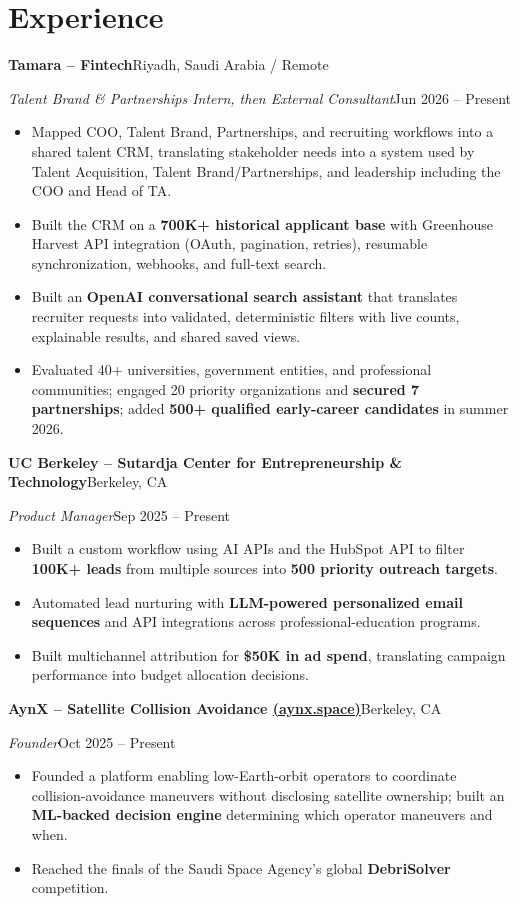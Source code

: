 \documentclass[a4paper,10pt]{article}
\newcommand{\entry}[4]{%
  \textbf{#1}\hfill #2\par
  \textit{#3}\hfill #4\par
}
\begin{document}
\section{Experience}
\entry{Tamara -- Fintech}{Riyadh, Saudi Arabia / Remote}
{Talent Brand \& Partnerships Intern, then External Consultant}{Jun 2026 -- Present}
\begin{itemize}
  \item Mapped COO, Talent Brand, Partnerships, and recruiting workflows into a shared talent CRM, translating stakeholder needs into a system used by Talent Acquisition, Talent Brand/Partnerships, and leadership including the COO and Head of TA.
  \item Built the CRM on a \textbf{700K+ historical applicant base} with Greenhouse Harvest API integration (OAuth, pagination, retries), resumable synchronization, webhooks, and full-text search.
  \item Built an \textbf{OpenAI conversational search assistant} that translates recruiter requests into validated, deterministic filters with live counts, explainable results, and shared saved views.
  \item Evaluated 40+ universities, government entities, and professional communities; engaged 20 priority organizations and \textbf{secured 7 partnerships}; added \textbf{500+ qualified early-career candidates} in summer 2026.
\end{itemize}
\entry{UC Berkeley -- Sutardja Center for Entrepreneurship \& Technology}{Berkeley, CA}
{Product Manager}{Sep 2025 -- Present}
\begin{itemize}
  \item Built a custom workflow using AI APIs and the HubSpot API to filter \textbf{100K+ leads} from multiple sources into \textbf{500 priority outreach targets}.
  \item Automated lead nurturing with \textbf{LLM-powered personalized email sequences} and API integrations across professional-education programs.
  \item Built multichannel attribution for \textbf{\$50K in ad spend}, translating campaign performance into budget allocation decisions.
\end{itemize}
\entry{AynX -- Satellite Collision Avoidance \;\href{https://aynx.space}{(aynx.space)}}{Berkeley, CA}
{Founder}{Oct 2025 -- Present}
\begin{itemize}
  \item Founded a platform enabling low-Earth-orbit operators to coordinate collision-avoidance maneuvers without disclosing satellite ownership; built an \textbf{ML-backed decision engine} determining which operator maneuvers and when.
  \item Reached the finals of the Saudi Space Agency's global \textbf{DebriSolver} competition.
\end{itemize}
\end{document}
